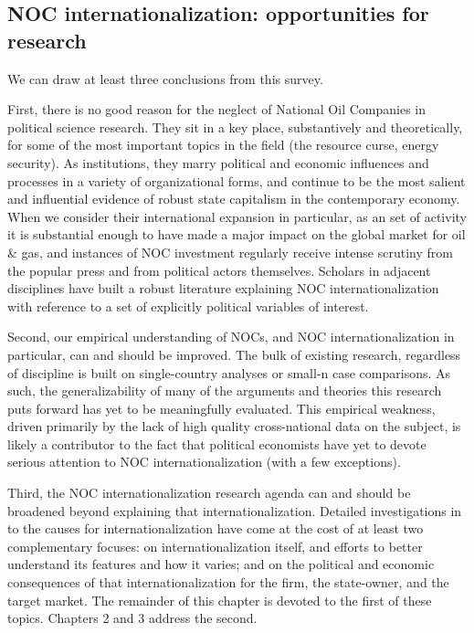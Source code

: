 \documentclass[11pt,]{book}
\begin{document}
\hypertarget{noc-internationalization-opportunities-for-research}{%
\subsection{NOC internationalization: opportunities for research}\label{noc-internationalization-opportunities-for-research}}

We can draw at least three conclusions from this survey.

First, there is no good reason for the neglect of National Oil Companies in political science research. They sit in a key place, substantively and theoretically, for some of the most important topics in the field (the resource curse, energy security). As institutions, they marry political and economic influences and processes in a variety of organizational forms, and continue to be the most salient and influential evidence of robust state capitalism in the contemporary economy. When we consider their international expansion in particular, as an set of activity it is substantial enough to have made a major impact on the global market for oil \& gas, and instances of NOC investment regularly receive intense scrutiny from the popular press and from political actors themselves. Scholars in adjacent disciplines have built a robust literature explaining NOC internationalization with reference to a set of explicitly political variables of interest.

Second, our empirical understanding of NOCs, and NOC internationalization in particular, can and should be improved. The bulk of existing research, regardless of discipline is built on single-country analyses or small-n case comparisons. As such, the generalizability of many of the arguments and theories this research puts forward has yet to be meaningfully evaluated. This empirical weakness, driven primarily by the lack of high quality cross-national data on the subject, is likely a contributor to the fact that political economists have yet to devote serious attention to NOC internationalization (with a few exceptions).

Third, the NOC internationalization research agenda can and should be broadened beyond explaining that internationalization. Detailed investigations in to the causes for internationalization have come at the cost of at least two complementary focuses: on internationalization itself, and efforts to better understand its features and how it varies; and on the political and economic consequences of that internationalization for the firm, the state-owner, and the target market. The remainder of this chapter is devoted to the first of these topics. Chapters 2 and 3 address the second.
\end{document}
